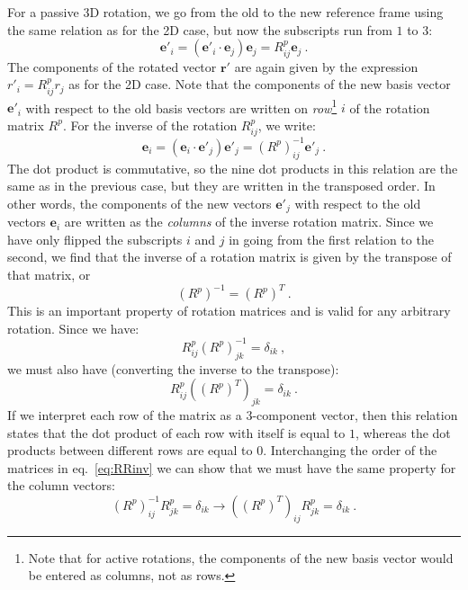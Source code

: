 For a passive 3D rotation, we go from the old to the new reference frame using the same relation as for the 2D case, but now the subscripts run from $1$ to $3$:
\[
	\mathbf{e}'_i = (\mathbf{e}'_i\cdot\mathbf{e}_j)\mathbf{e}_j = R^p_{ij}\mathbf{e}_j\ .
\]
The components of the rotated vector $\mathbf{r}'$ are again given by the expression $r'_i = R^p_{ij}r_j$ as for the 2D case.  Note that the components of the new basis vector $\mathbf{e}'_i$ with respect to the old basis vectors are written on \textit{row}\footnote{Note that for active rotations, the components of the new basis vector would be entered as columns, not as rows.} $i$ of the rotation matrix $R^p$. For the inverse of the rotation $R^p_{ij}$, we write:
\[
	\mathbf{e}_i = (\mathbf{e}_i\cdot\mathbf{e}'_j)\mathbf{e}'_j = (R^p)^{-1}_{ij}\mathbf{e}'_j\ .
\]
The dot product is commutative, so the nine dot products in this relation are the same as in the previous case, but they are written in the transposed order.  In other words, the components of the new vectors $\mathbf{e}'_j$ with respect to the old vectors $\mathbf{e}_i$ are written as the \textit{columns} of the inverse rotation matrix.  Since we have only flipped the subscripts $i$ and $j$ in going from the first relation to the second, we find that the inverse of a rotation matrix is given by the transpose of that matrix, or
\[
	(R^p)^{-1} = (R^p)^T\ .
\]
This is an important property of rotation matrices and is valid for any arbitrary rotation.  Since we have:
\begin{equation}
	R^p_{ij} (R^p)^{-1}_{jk} = \delta_{ik}\ ,\label{eq:RRinv}
\end{equation}
we must also have (converting the inverse to the transpose):
\begin{equation}
	R^p_{ij} \left((R^p)^T\right)_{jk} = \delta_{ik}\ .
\end{equation}
If we interpret each row of the matrix as a $3$-component vector, then this relation states that the dot product of each row with itself is equal to $1$, whereas the dot products between different rows are equal to $0$.  Interchanging the order of the matrices in eq.~\ref{eq:RRinv} we can show that we must have the same property for the column vectors:
\begin{equation}
	(R^p)^{-1}_{ij}R^p_{jk} = \delta_{ik} \rightarrow \left((R^p)^T\right)_{ij} R^p_{jk} = \delta_{ik}\ .
\end{equation}
